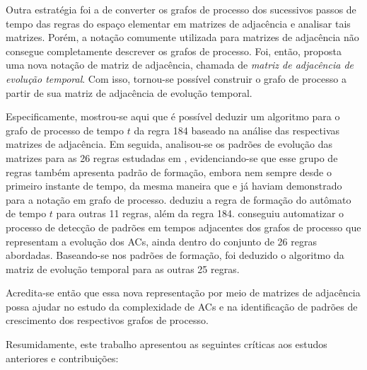 \documentclass[12pt,a4paper]{article}
\begin{document}
Outra estratégia foi a de converter os grafos de processo dos sucessivos
passos de tempo das regras do espaço elementar em matrizes de adjacência e analisar
tais matrizes. Porém, a notação comumente utilizada para matrizes de adjacência
não consegue completamente descrever os grafos de processo. Foi, então, proposta uma
nova notação de matriz de adjacência, chamada de \textit{matriz de
adjacência de evolução temporal}. Com isso, tornou-se possível construir o
grafo de processo a partir de sua matriz de adjacência de evolução temporal.

Especificamente, mostrou-se aqui que é possível deduzir um algoritmo para o
grafo de processo de tempo $t$ da regra 184 baseado na análise das respectivas
matrizes de adjacência. Em seguida, analisou-se
os padrões de evolução das matrizes para as 26 regras estudadas em
, evidenciando-se que esse grupo de regras
também apresenta padrão de formação, embora nem sempre desde o primeiro
instante de tempo, da mesma maneira que  e
 já haviam demonstrado para a notação em grafo de processo.
 deduziu a regra de formação do autômato de
tempo $t$ para outras 11 regras, além da regra 184. 
conseguiu automatizar o processo de detecção de padrões em tempos adjacentes
dos grafos de processo que representam a evolução dos ACs, ainda dentro do
conjunto de 26 regras abordadas. Baseando-se nos padrões de formação, foi
deduzido o algoritmo da matriz de evolução temporal para as outras 25 regras.

Acredita-se então que essa nova representação por meio de matrizes de
adjacência possa ajudar no estudo da complexidade de ACs e na identificação
de padrões de crescimento dos respectivos grafos de processo.

Resumidamente, este trabalho apresentou as seguintes críticas aos estudos
anteriores e contribuições:
\end{document}
